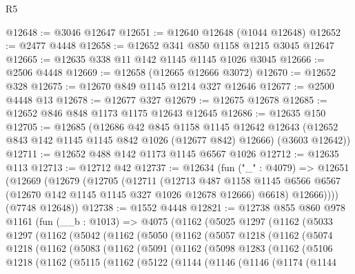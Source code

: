 \begin{lexlean}{R5}
\begin{coremodule}
@12648 := @3046 @12647
@12651 := @12640 @12648 (@1044 @12648)
@12652 := @2477 @4448
@12658 := @12652 @341 @850 @1158 @1215 @3045 @12647
@12665 := @12635 @338 @11 @142 @1145 @1145 @1026 @3045
@12666 := @2506 @4448
@12669 := @12658 (@12665 @12666 @3072)
@12670 := @12652 @328
@12675 := @12670 @849 @1145 @1214 @327 @12646
@12677 := @2500 @4448 @13
@12678 := @12677 @327
@12679 := @12675 @12678
@12685 := @12652 @846 @848 @1173 @1175 @12643 @12645
@12686 := @12635 @150
@12705 := @12685
    (@12686
      @42
      @845
      @1158
      @1145
      @12642
      @12643
      (@12652 @843 @142 @1145 @1145 @842 @1026 (@12677 @842) @12666)
      (@3603 @12642))
@12711 := @12652 @488 @142 @1173 @1145 @6567 @1026
@12712 := @12635 @113
@12713 := @12712 @42
@12737 := @12634
    (fun ("_" : @4079) =>
    @12651
      (@12669
        (@12679
          (@12705
            (@12711
              (@12713
                @487
                @1158
                @1145
                @6566
                @6567
                (@12670 @142 @1145 @1145 @327 @1026 @12678 @12666)
                @6618)
              @12666))))
      (@7748 @12648))
@12738 := @1552 @4448
@12821 := @12738
    @855
    @860
    @978
    @1161
    (fun (__b : @1013) =>
    @4075
      (@1162
        (@5025
          @1297
          (@1162
            (@5033
              @1297
              (@1162
                (@5042
                  (@1162
                    (@5050
                      (@1162
                        (@5057
                          @1218
                          (@1162
                            (@5074
                              @1218
                              (@1162
                                (@5083
                                  (@1162
                                    (@5091
                                      (@1162
                                        (@5098
                                          @1283
                                          (@1162
                                            (@5106
                                              @1218
                                              (@1162
                                                (@5115
                                                  (@1162
                                                    (@5122
                                                      (@1144
                                                        (@1146
                                                          (@1146
                                                            (@1174
                                                              (@1144

\end{coremodule}
\end{lexlean}
